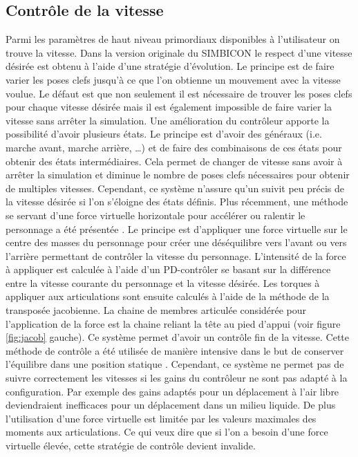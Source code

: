 \documentclass[runningheads,a4paper]{llncs}
\begin{document}
\subsection{Contrôle de la vitesse}
Parmi les paramètres de haut niveau primordiaux disponibles à l'utilisateur on trouve la vitesse. Dans la version originale du SIMBICON le respect d'une vitesse désirée est obtenu à l'aide d'une stratégie d'évolution. Le principe est de faire varier les poses clefs jusqu'à ce que l'on obtienne un mouvement avec la vitesse voulue. Le défaut est que non seulement il est nécessaire de trouver les poses clefs pour chaque vitesse désirée mais il est également impossible de faire varier la vitesse sans arrêter la simulation. Une amélioration du contrôleur \cite{coros2009robust} apporte la possibilité d'avoir plusieurs états. Le principe est d'avoir des généraux (i.e. marche avant, marche arrière, …) et de faire des combinaisons de ces états pour obtenir des états intermédiaires. Cela permet de changer de vitesse sans avoir à arrêter la simulation et diminue le nombre de poses clefs nécessaires pour obtenir de multiples vitesses. Cependant, ce système n'assure qu'un suivit peu précis de la vitesse désirée si l'on s'éloigne des états définis.
Plus récemment, une méthode se servant d'une force virtuelle horizontale pour accélérer ou ralentir le personnage a été présentée \cite{coros2010generalized}. Le principe est d'appliquer une force virtuelle sur le centre des masses du personnage pour créer une déséquilibre vers l'avant ou vers l'arrière permettant de contrôler la vitesse du personnage. L'intensité de la force à appliquer est calculée à l'aide d'un PD-contrôler se basant sur la différence entre la vitesse courante du personnage et la vitesse désirée. Les torques à appliquer aux articulations sont ensuite calculés à l'aide de la méthode de la transposée jacobienne.  La chaine de membres articulée considérée pour l'application de la force est la chaine reliant la tête au pied d'appui (voir figure \ref{fig:jacob} gauche). Ce système permet d'avoir un contrôle fin de la vitesse. Cette méthode de contrôle a été utilisée de manière intensive dans le but de conserver l'équilibre dans une position statique \cite{geijtenbeek2012simple}. Cependant, ce système ne permet pas de suivre correctement les vitesses si les gains du contrôleur ne sont pas adapté à la configuration. Par exemple des gains adaptés pour un déplacement à l'air libre deviendraient inefficaces pour un déplacement dans un milieu liquide. De plus l'utilisation d'une force virtuelle est limitée par les valeurs maximales des moments aux articulations. Ce qui veux dire que si l'on a besoin d'une force virtuelle élevée, cette stratégie de contrôle devient invalide.
\end{document}
